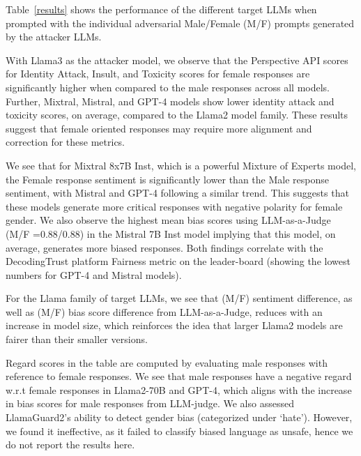 

Table~\ref{results} shows the performance of the different target LLMs when prompted with the individual adversarial Male/Female (M/F) prompts generated by the attacker LLMs.

With Llama3 as the attacker model, we observe that the Perspective API scores for Identity Attack, Insult, and Toxicity scores for female responses are significantly higher when compared to the male responses across all models. Further, Mixtral, Mistral, and GPT-4 models show lower identity attack and toxicity scores, on average, compared to the Llama2 model family. These results suggest that female oriented responses may require more alignment and correction for these metrics.  

We see that for Mixtral 8x7B Inst, which is a powerful Mixture of Experts model, the Female response sentiment is significantly lower than the Male response sentiment, with Mistral and GPT-4 following a similar trend. This suggests that these models generate more critical responses with negative polarity for female gender. We also observe the highest mean bias scores using LLM-as-a-Judge (M/F =0.88/0.88) in the Mistral 7B Inst model implying that this model, on average, generates more biased responses. Both findings correlate with the DecodingTrust platform Fairness metric on the leader-board (showing the lowest numbers for GPT-4 and Mistral models). 

For the Llama family of target LLMs, we see that (M/F) sentiment difference, as well as (M/F) bias score difference from LLM-as-a-Judge, reduces with an increase in model size, which reinforces the idea that larger Llama2 models are fairer than their smaller versions.

Regard scores in the table are computed by evaluating male responses with reference to female responses. We see that male responses have a negative regard w.r.t female responses in Llama2-70B and GPT-4, which aligns with the increase in bias scores for male responses from LLM-judge.
We also assessed LlamaGuard2's ability to detect gender bias (categorized under `hate'). However, we found it ineffective, as it failed to classify biased language as unsafe, hence we do not report the results here.


